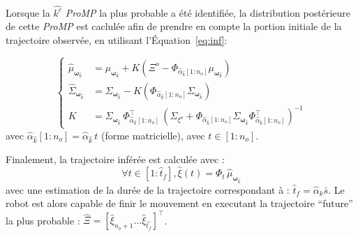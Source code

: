 \documentclass[utf8]{frontiersSCNS} %
\newcommand{\rev}[1]{\textcolor{blue}{#1}}
\newcommand{\todo}[1]{\textcolor{red}{\textbf{/*#1*/}}}
\begin{document}


Lorsque la $\hat{k^e}$ \textit{ProMP} la plus probable a été identifiée, la distribution postérieure de cette \textit{ProMP} est caclulée afin de prendre en compte la portion initiale de la trajectoire observée, en utilisant l'Équation~\ref{eq:inf}:


\begin{equation} \label{eq:udateWithAlpha}
\left\{
\begin{array}{rl}
\hat{\mu}_{\boldsymbol{\omega}_{\hat{k}}} &= \mu_{\boldsymbol{\omega}_{\hat{k}}}  + K(\Xi^o - \Phi_{\hat{\alpha}_{\hat{k}}[1:{n_o}]}\mu_{\boldsymbol{\omega}_{\hat{k}}} ) \\ 
\hat{\Sigma}_{\boldsymbol{\omega}_{\hat{k}}}  &= \Sigma_{\boldsymbol{\omega}_{\hat{k}}}  - K(\Phi_{\hat{\alpha}_{\hat{k}}[1:{n_o}]} \Sigma_{\boldsymbol{\omega}_{\hat{k}}} ) \\
K&= \Sigma_{\boldsymbol{\omega}_{\hat{k}}} \, \Phi_{\hat{\alpha}_{\hat{k}}[1:{n_o}]}^\top \, (\Sigma_{\xi^o} + \Phi_{\hat{\alpha}_{\hat{k}}[1:n_o]}\Sigma_{\boldsymbol{\omega}_{\hat{k}}}  \Phi_{\hat{\alpha}_{\hat{k}}[1:n_o]}^\top)^{-1}
\end{array}
\right.
\end{equation}
avec $\hat{\alpha}_{\hat{k}}[1:n_o] = \hat{\alpha}_{\hat{k}} \, t$ (forme matricielle), avec $t \in [1:n_o]$.

Finalement, la trajectoire inférée est calculée avec : 
$$\forall t \in [1:\hat{t}_f], \hat{\xi}(t) = \Phi_t \, \hat{\mu}_{\boldsymbol{\omega}_{\hat{k}}}$$
avec une estimation de la durée de la trajectoire correspondant à : $\hat{t}_f = \hat{\alpha}_k\bar{s}$.
Le robot est alors capable de finir le mouvement en executant la trajectoire ``future'' la plus probable : $\hat{\Xi} =[\hat{\xi}_{n_o+1} \ldots \hat{\xi}_{\hat{t_{f}}}]^\top$.
\end{document}
